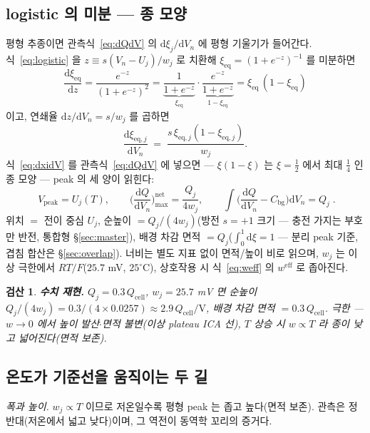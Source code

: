 \documentclass[11pt,a4paper]{article}
\newtheorem*{verifybox}{검산}
\newcommand{\dd}{\mathrm{d}}
\newcommand{\eff}{\mathrm{eff}}
\newcommand{\eq}{\mathrm{eq}}
\newcommand{\cell}{\mathrm{cell}}
\newcommand{\bg}{\mathrm{bg}}
\newcommand{\peak}{\mathrm{peak}}
\begin{document}
\subsection{logistic 의 미분 — 종 모양}
평형 추종이면 관측식~\eqref{eq:dQdV} 의 $\dd\xi_j/\dd V_n$ 에 평형 기울기가 들어간다. 식~\eqref{eq:logistic} 을 $z\equiv s(V_n-U_j)/w_j$ 로 치환해 $\xi_{\eq}=(1+e^{-z})^{-1}$ 를 미분하면
\begin{equation}
\frac{\dd\xi_{\eq}}{\dd z}
=\frac{e^{-z}}{(1+e^{-z})^{2}}
=\underbrace{\frac{1}{1+e^{-z}}}_{\xi_{\eq}}\cdot
\underbrace{\frac{e^{-z}}{1+e^{-z}}}_{1-\xi_{\eq}}
=\xi_{\eq}\,(1-\xi_{\eq})
\label{eq:belliden}
\end{equation}
이고, 연쇄율 $\dd z/\dd V_n=s/w_j$ 를 곱하면
\begin{equation}
\frac{\dd\xi_{\eq,j}}{\dd V_n}\;=\;\frac{s\,\xi_{\eq,j}(1-\xi_{\eq,j})}{w_j}.
\label{eq:dxidV}
\end{equation}
식~\eqref{eq:dxidV} 를 관측식~\eqref{eq:dQdV} 에 넣으면 — $\xi(1-\xi)$ 는 $\xi=\tfrac12$ 에서 최대 $\tfrac14$ 인 종 모양 — peak 의 세 양이 읽힌다:
\begin{equation}
\boxed{\;V_\peak=U_j(T),\qquad
\Big(\frac{\dd Q}{\dd V_n}\Big)^{\text{net}}_{\max}=\frac{Q_j}{4w_j},\qquad
\int\Big(\frac{\dd Q}{\dd V_n}-C_\bg\Big)\dd V_n=Q_j\;.}
\label{eq:eqpeak}
\end{equation}
위치 $=$ 전이 중심 $U_j$, 순높이 $=Q_j/(4w_j)$(방전 $s=+1$ 크기 — 충전 가지는 부호만 반전, 통합형 \S\ref{sec:master}), 배경 차감 면적 $=Q_j$($\int_0^1\dd\xi=1$ — 분리 peak 기준, 겹침 합산은 \S\ref{sec:overlap}). 너비는 별도 지표 없이 면적/높이 비로 읽으며, $w_j$ 는 이상 극한에서 $RT/F$($25.7$ mV, $25^\circ$C), 상호작용 시 식~\eqref{eq:weff} 의 $w^{\eff}$ 로 좁아진다.

\begin{verifybox}
\textbf{수치 재현.} $Q_j=0.3\,Q_\cell$, $w_j=25.7$ mV 면 순높이 $Q_j/(4w_j)=0.3/(4\times0.0257)\approx2.9\,Q_\cell/\mathrm V$, 배경 차감 면적 $=0.3\,Q_\cell$. 극한 — $w\to0$ 에서 높이 발산$\cdot$면적 불변(이상 plateau ICA 선), $T$ 상승 시 $w\propto T$ 라 종이 낮고 넓어진다(면적 보존).
\end{verifybox}

\subsection{온도가 기준선을 움직이는 두 길}
\emph{폭과 높이.} $w_j\propto T$ 이므로 저온일수록 평형 peak 는 좁고 높다(면적 보존). 관측은 정반대(저온에서 넓고 낮다)이며, 그 역전이 동역학 꼬리의 증거다.
\end{document}
